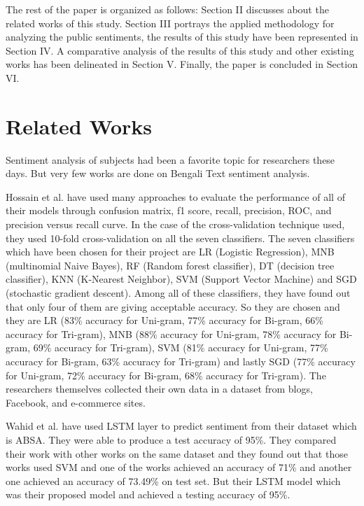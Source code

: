 \documentclass[conference]{IEEEtran}
\begin{document}
The rest of the paper is organized as follows: Section II discusses about the related works of this study. Section III portrays the applied methodology for analyzing the public sentiments, the results of this study have been represented in Section IV. A comparative analysis of the results of this study and other existing works has been delineated in Section V. Finally, the paper is concluded in Section VI.  

\section{Related Works}
Sentiment analysis of subjects had been a favorite topic for researchers these days. But very few works are done on Bengali Text sentiment analysis. 
\par
Hossain et al. \cite{b2} have used many approaches to evaluate the performance of all of their models through confusion matrix, f1 score, recall, precision, ROC, and precision versus recall curve. In the case of the cross-validation technique used, they used 10-fold cross-validation on all the seven classifiers. The seven classifiers which have been chosen for their project are LR (Logistic Regression), MNB (multinomial Naive Bayes), RF (Random forest classifier), DT (decision tree classifier), KNN (K-Nearest Neighbor), SVM (Support Vector Machine) and SGD (stochastic gradient descent). Among all of these classifiers, they have found out that only four of them are giving acceptable accuracy. So they are chosen and they are LR (83\% accuracy for Uni-gram, 77\% accuracy for Bi-gram, 66\% accuracy for Tri-gram), MNB (88\% accuracy for Uni-gram, 78\% accuracy for Bi-gram, 69\% accuracy for Tri-gram), SVM (81\% accuracy for Uni-gram, 77\% accuracy for Bi-gram, 63\% accuracy for Tri-gram) and lastly SGD (77\% accuracy for Uni-gram, 72\% accuracy for Bi-gram, 68\% accuracy for Tri-gram). The researchers themselves collected their own data in a dataset from blogs, Facebook, and e-commerce sites. \par
Wahid et al. \cite{b3} have used LSTM layer to predict sentiment from their dataset which is ABSA. They were able to produce a test accuracy of 95\%. They compared their work with other works on the same dataset and they found out that those works used SVM and one of the works achieved an accuracy of 71\% and another one achieved an accuracy of 73.49\% on test set. But their LSTM model which was their proposed model and achieved a testing accuracy of 95\%. \par
\end{document}
